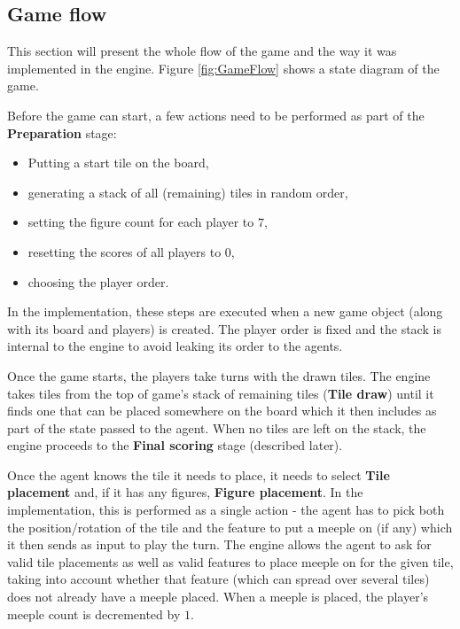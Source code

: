 \subsection{Game flow}

This section will present the whole flow of the game and the way it was implemented in the engine.
Figure \ref{fig:GameFlow} shows a state diagram of the game.

\begin{figure*}
	\centering
	\scalebox{.42}{}
	\caption{Carcassonne's state diagram.}
	\label{fig:GameFlow}
\end{figure*}

Before the game can start, a few actions need to be performed as part of the \textbf{Preparation} stage:
\begin{itemize}
	\item Putting a start tile on the board,
	\item generating a stack of all (remaining) tiles in random order,
	\item setting the figure count for each player to $7$,
	\item resetting the scores of all players to $0$,
	\item choosing the player order.
\end{itemize}
In the implementation, these steps are executed when a new game object (along with its board
and players) is created. The player order is fixed and the stack is internal to the engine
to avoid leaking its order to the agents.

Once the game starts, the players take turns with the drawn tiles. The engine takes tiles from
the top of game's stack of remaining tiles (\textbf{Tile draw}) until it finds one that can be
placed somewhere on the board which it then includes as part of the state passed to the agent.
When no tiles are left on the stack, the engine proceeds to the \textbf{Final scoring} stage
(described later).

Once the agent knows the tile it needs to place, it needs to select \textbf{Tile placement} and,
if it has any figures, \textbf{Figure placement}. In the implementation, this is performed
as a single action - the agent has to pick both the position/rotation of the tile and the feature
to put a meeple on (if any) which it then sends as input to play the turn.
The engine allows the agent to ask for valid tile placements as well as valid features to
place meeple on for the given tile, taking into account whether that feature (which can spread
over several tiles) does not already have a meeple placed. When a meeple is placed,
the player's meeple count is decremented by $1$.

